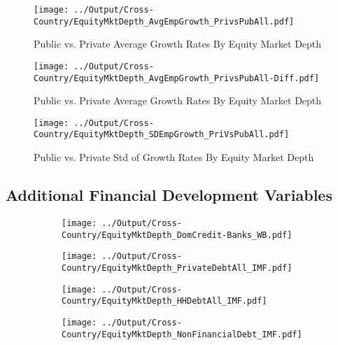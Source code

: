 \documentclass[12pt,notitlepage]{article}
\begin{document}
\begin{center}
\begin{figure}[htbp]

\centering
\caption{Public vs. Private Average Growth Rates By Equity Market Depth}
 \texttt{[image: ../Output/Cross-Country/EquityMktDepth\_AvgEmpGrowth\_PrivsPubAll.pdf]}


\end{figure}
\end{center}


\begin{center}
\begin{figure}[htbp]

\centering
\caption{Public vs. Private Average Growth Rates By Equity Market Depth}
 \texttt{[image: ../Output/Cross-Country/EquityMktDepth\_AvgEmpGrowth\_PrivsPubAll-Diff.pdf]}


\end{figure}
\end{center}


\begin{center}
\begin{figure}[htbp]

\centering
\caption{Public vs. Private Std of Growth Rates By Equity Market Depth}
 \texttt{[image: ../Output/Cross-Country/EquityMktDepth\_SDEmpGrowth\_PriVsPubAll.pdf]}


\end{figure}
\end{center}

\FloatBarrier
\subsection{Additional Financial Development Variables}
\FloatBarrier



\begin{figure}[!htpb]
 \caption{Total Factor Productivity and Financial Development Variables}
\centering
\begin{subfigure}{.49\textwidth}
    \centering
 \texttt{[image: ../Output/Cross-Country/EquityMktDepth\_DomCredit-Banks\_WB.pdf]}
\end{subfigure}%
\begin{subfigure}{.49\textwidth}
    \centering
 \texttt{[image: ../Output/Cross-Country/EquityMktDepth\_PrivateDebtAll\_IMF.pdf]}
\end{subfigure}
\begin{subfigure}{.49\textwidth}
    \centering
 \texttt{[image: ../Output/Cross-Country/EquityMktDepth\_HHDebtAll\_IMF.pdf]}
\end{subfigure}%
\begin{subfigure}{.49\textwidth}
    \centering
 \texttt{[image: ../Output/Cross-Country/EquityMktDepth\_NonFinancialDebt\_IMF.pdf]}
\end{subfigure}
\end{figure}
\end{document}
